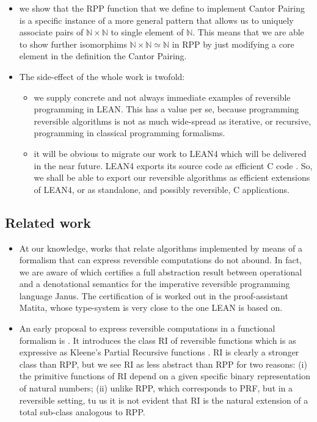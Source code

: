 \documentclass[runningheads]{llncs}
\newcommand{\RPP}{\textsf{RPP}\xspace}
\newcommand{\PRF}{\textsf{PRF}\xspace}
\newcommand{\CPP}{\textsf{C}\xspace}
\newcommand{\LEAN}{\textsf{LEAN}\xspace}
\newcommand{\LEANFour}{\textsf{LEAN4}\xspace}
\newcommand{\JMF}{\textsf{RI}\xspace} %
\newcommand{\Janus}{\textsf{Janus}\xspace}
\newcommand{\Matita}{\textsf{Matita}\xspace}
\begin{document}
\begin{itemize}
    \item we show that the \RPP function that we define to implement Cantor Pairing is a specific instance of a more general pattern that allows us to uniquely associate pairs of $ \mathbb{N}\times\mathbb{N}$ to single element of $ \mathbb{N}$. This means that we are able to show further isomorphims  $ \mathbb{N}\times\mathbb{N}\simeq \mathbb{N}$ in \RPP by just modifying a core element in the definition the Cantor Pairing.

    \item The side-effect of the whole work is twofold:
    \begin{itemize}
        \item we supply concrete and not always immediate examples of reversible programming in \LEAN. This has a value per se, because programming reversible algorithms is not as much wide-spread as iterative, or recursive, programming in classical programming formalisms.
        \item it will be obvious to migrate our work to \LEANFour which will be delivered in the near future. \LEANFour exports its source code as efficient \CPP code \cite{2021-LEAN4-MouraUllrich}. So, we shall be able to export our reversible algorithms as efficient extensions of \LEANFour, or as standalone, and possibly reversible, \CPP applications.
    \end{itemize}
\end{itemize}

\subsection{Related work}
\begin{itemize}
\item
At our knowledge, works that relate algorithms implemented by means of a formalism that can express reversible computations do not abound. In fact, we are aware of \cite{paoliniTYPES2015} which certifies a full abstraction result between operational and a denotational semantics for the imperative reversible programming language \Janus \cite[Section 8.3.3]{perumalla2013chc}. The certification of \cite{paoliniTYPES2015} is worked out in the proof-assistant \Matita \cite{Asperti2007}, whose type-system is very close to the one \LEAN is based on.

\item
An early proposal to express reversible computations in a functional formalism is \cite{jacopini89tcs}. It introduces the class \JMF of reversible functions which is as expressive as Kleene's
Partial Recursive functions \cite{cutland1980book,odifreddi1989book}.
\JMF is clearly a stronger class than \RPP, but we see \JMF as less abstract than \RPP for two reasons: (i) the primitive functions of \JMF depend on a given specific binary representation of natural numbers; (ii) unlike \RPP, which corresponds to \PRF, but in a reversible setting, tu us it is not evident that \JMF is the natural extension of a total sub-class analogous to \RPP.
\end{itemize}
\end{document}
